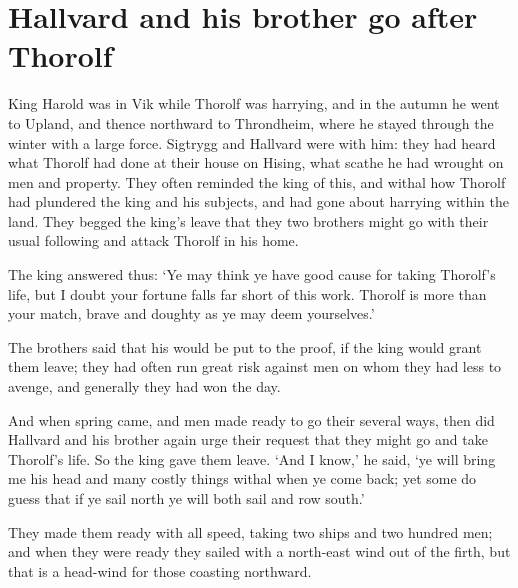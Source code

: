 \chapter{Hallvard and his brother go after Thorolf}
King Harold was in Vik while Thorolf was harrying, and in the autumn he went to Upland, and thence northward to Throndheim, where he stayed through the winter with a large force. Sigtrygg and Hallvard were with him: they had heard what Thorolf had done at their house on Hising, what scathe he had wrought on men and property. They often reminded the king of this, and withal how Thorolf had plundered the king and his subjects, and had gone about harrying within the land. They begged the king's leave that they two brothers might go with their usual following and attack Thorolf in his home.

The king answered thus: `Ye may think ye have good cause for taking Thorolf's life, but I doubt your fortune falls far short of this work. Thorolf is more than your match, brave and doughty as ye may deem yourselves.'

The brothers said that his would be put to the proof, if the king would grant them leave; they had often run great risk against men on whom they had less to avenge, and generally they had won the day.

And when spring came, and men made ready to go their several ways, then did Hallvard and his brother again urge their request that they might go and take Thorolf's life. So the king gave them leave. `And I know,' he said, `ye will bring me his head and many costly things withal when ye come back; yet some do guess that if ye sail north ye will both sail and row south.'

They made them ready with all speed, taking two ships and two hundred men; and when they were ready they sailed with a north-east wind out of the firth, but that is a head-wind for those coasting northward.
